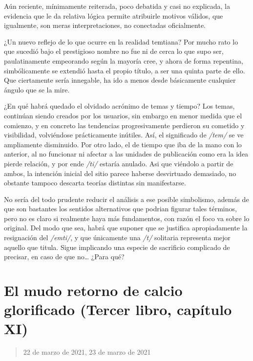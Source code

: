 \documentclass[
]{book}
\begin{document}
Aún reciente, mínimamente reiterada, poco debatida y casi no explicada, la evidencia que le da relativa lógica permite atribuirle motivos válidos, que igualmente, son meras interpretaciones, no conectadas oficialmente.

¿Un nuevo reflejo de lo que ocurre en la realidad temtiana? Por mucho rato lo que sucedió bajo el prestigioso nombre no fue ni de cerca lo que supo ser, paulatinamente empeorando según la mayoría cree, y ahora de forma repentina, simbólicamente se extendió hasta el propio título, a ser una quinta parte de ello. Que ciertamente sería innegable, ha ido a menos desde básicamente cualquier ángulo que se la mire.

¿En qué habrá quedado el olvidado acrónimo de temas y tiempo? Los temas, continúan siendo creados por los usuarios, sin embargo en menor medida que el comienzo, y en concreto las tendencias progresivamente perdieron su cometido y visibilidad, volviéndose prácticamente inútiles. Así, el significado de \emph{/tem/} se ve ampliamente disminuido. Por otro lado, el de tiempo que iba de la mano con lo anterior, al no funcionar ni afectar a las unidades de publicación como era la idea pierde relación, y por ende \emph{/ti/} estaría anulado. Asi que viéndolo a partir de ambos, la intención inicial del sitio parece haberse desvirtuado demasiado, no obstante tampoco descarta teorías distintas sin manifestarse.

No sería del todo prudente reducir el análisis a ese posible simbolismo, además de que son bastantes los sentidos alternativos que podrian figurar tales términos, pero no es claro si realmente haya más fundamentos, con razón el foco va sobre lo original. Del modo que sea, habrá que suponer que se justifica apropiadamente la resignación del \emph{/emti/}, y que únicamente una \emph{/t/} solitaria representa mejor aquello que titula. Sigue implicando una especie de sacrificio complicado de precisar, en caso de que no\ldots{} ¿Para qué?

\hypertarget{el-mudo-retorno-de-calcio-glorificado-tercer-libro-capuxedtulo-xi}{%
\section{El mudo retorno de calcio glorificado (Tercer libro, capítulo XI)}\label{el-mudo-retorno-de-calcio-glorificado-tercer-libro-capuxedtulo-xi}}

\begin{quote}
22 de marzo de 2021, 23 de marzo de 2021
\end{quote}
\end{document}
